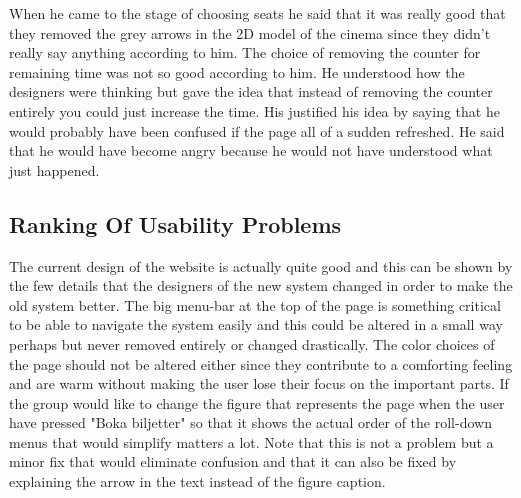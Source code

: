 \documentclass[a4paper,11pt]{article}
\begin{document}
When he came to the stage of choosing seats he said that it was really good that they removed the grey arrows in the 2D model of the cinema since they didn't really say anything according to him. The choice of removing the counter for remaining time was not so good according to him. He understood how the designers were thinking but gave the idea that instead of removing the counter entirely you could just increase the time. His justified his idea by saying that he would probably have been confused if the page all of a sudden refreshed. He said that he would have become angry because he would not have understood what just happened.



\newpage
\subsection{Ranking Of Usability Problems}
The current design of the website is actually quite good and this can be shown by the few details that the designers of the new system changed in order to make the old system better. The big menu-bar at the top of the page is something critical to be able to navigate the system easily and this could be altered in a small way perhaps but never removed entirely or changed drastically. The color choices of the page should not be altered either since they contribute to a comforting feeling and are warm without making the user lose their focus on the important parts. If the group would like to change the figure that represents the page when the user have pressed "Boka biljetter" so that it shows the actual order of the roll-down menus that would simplify matters a lot. Note that this is not a problem but a minor fix that would eliminate confusion and that it can also be fixed by explaining the arrow in the text instead of the figure caption.  
\end{document}
